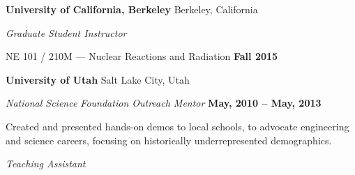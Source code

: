 
{\bf University of California, Berkeley} \hfill{ Berkeley, California}

\vspace*{-.05in}
{\em Graduate Student Instructor} 

\begin{list2}
\item NE 101 / 210M --- Nuclear Reactions and Radiation  \hfill {\bf Fall 2015}

% 
% 
\end{list2}

{\bf University of Utah} \hfill{ Salt Lake City, Utah}

\vspace*{-.05in}
{\em National Science Foundation Outreach Mentor} \hfill {\bf May, 2010 -- May, 2013}

\begin{list2}
\item Created and presented hands-on demos to local schools, to advocate engineering and science careers, focusing on historically underrepresented demographics.
\end{list2}
\vspace*{-.05in}
{\em Teaching Assistant} 

